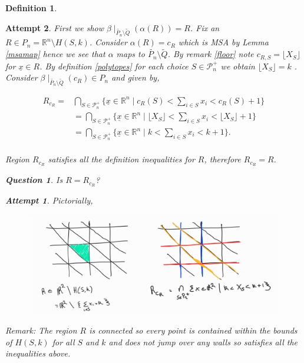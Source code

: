 \documentclass[a4paper,12pt]{article}
\newtheorem{attempt}{Attempt}
\newtheorem{question}{Question}
\theoremstyle{definition}
\newtheorem{definition}{Definition}[section]
\theoremstyle{indented}
\begin{document}
\begin{definition}
\begin{attempt}
 First we show $\beta \mid _{\tilde{P_n}\setminus \tilde{Q}}(\alpha(R))=R$. Fix an $R \in P_n= \mathbb{R}^n \setminus H(S,k)$. Consider $\alpha(R)= c_R$ which is MSA by Lemma \ref{msamap} hence we see that $\alpha$ maps to $\tilde{P_n}\setminus \tilde{Q}$. By remark \ref{floor} note $c_{R,S}=\lfloor X_S \rfloor$ for $\underline{x} \in R$. By definition \ref{polytopes} for each choice $S \in \mathcal{P}_{n}^{+}$ we obtain $\lfloor X_S \rfloor=k$ . Consider $\beta \mid _{\tilde{P_n}\setminus \tilde{Q}}(c_R)\in P_n$ and given by, 
 
 \begin{align*}
     R_{c_R}=& \bigcap_{S \in \mathcal{P}_{n}^{+}} \{\underline{x}\in \mathbb{R}^n \mid c_{R}(S) < \sum_{i \in S} x_i < c_{R}(S)+1\}\\
     &= \bigcap_{S \in \mathcal{P}_{n}^{+}} \{\underline{x}\in \mathbb{R}^n \mid \lfloor X_S \rfloor < \sum_{i \in S} x_i < \lfloor X_S \rfloor +1\}\\
     &= \bigcap_{S \in \mathcal{P}_{n}^{+}} \{\underline{x}\in \mathbb{R}^n \mid k < \sum_{i \in S} x_i < k+1\}.\\
 \end{align*}
 
 Region $R_{c_R}$ satisfies all the definition inequalities for $R$, therefore $R_{c_R}=R$.

\begin{question}
Is $R=R_{c_R}$? 
\end{question}

\begin{attempt}

Pictorially, 
       \begin{figure}[H]
    \centering
 \includegraphics[scale=0.35,angle=0]{29072020 pics/RCR.jpg}  
    \caption{}
    \label{RCR}
\end{figure}

 Remark: The region $R$ is connected so every point is contained within the bounds of $H(S,k)$ for all $S$ and $k$ and does not jump over any walls so satisfies all the inequalities above.\\
 

\end{attempt}
\end{attempt}
\end{definition}
\end{document}
